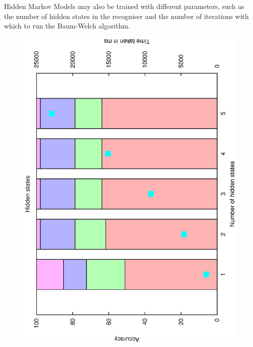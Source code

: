 \documentclass[12pt,a4,notitlepage]{report}
\renewcommand{\_}{\texttt{\symbol{95}}}
\newcommand{\<}{\texttt{\symbol{60}}}
\renewcommand{\>}{\texttt{\symbol{62}}}
\begin{document}
Hidden Markov Models may also be trained with different parameters, such as the number of hidden states in the recogniser and the number of iterations with which to run the Baum-Welch algorithm.

\begin{figure}
\centering
\includegraphics[scale=0.3,angle=-90]{results/markov/m_hidden_states.ps}

\end{figure}
\end{document}
